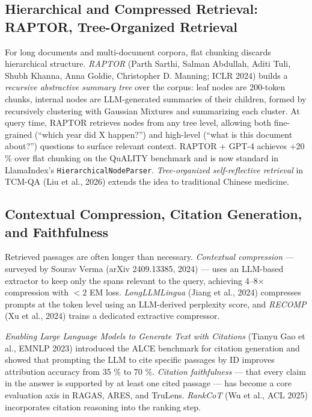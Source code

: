 \subsection{Hierarchical and Compressed Retrieval: RAPTOR, Tree-Organized Retrieval}\label{hierarchical-and-compressed-retrieval-raptor-tree-organized-retrieval}

For long documents and multi-document corpora, flat chunking discards hierarchical structure. \emph{RAPTOR} (Parth Sarthi, Salman Abdullah, Aditi Tuli, Shubh Khanna, Anna Goldie, Christopher D. Manning; ICLR 2024) builds a \emph{recursive abstractive summary tree} over the corpus: leaf nodes are 200-token chunks, internal nodes are LLM-generated summaries of their children, formed by recursively clustering with Gaussian Mixtures and summarizing each cluster. At query time, RAPTOR retrieves nodes from any tree level, allowing both fine-grained (``which year did X happen?'') and high-level (``what is this document about?'') questions to surface relevant context. RAPTOR + GPT-4 achieves +20 \% over flat chunking on the QuALITY benchmark and is now standard in LlamaIndex's \texttt{HierarchicalNodeParser}. \emph{Tree-organized self-reflective retrieval} in TCM-QA (Liu et al., 2026) extends the idea to traditional Chinese medicine.

\subsection{Contextual Compression, Citation Generation, and Faithfulness}\label{contextual-compression-citation-generation-and-faithfulness}

Retrieved passages are often longer than necessary. \emph{Contextual compression} --- surveyed by Sourav Verma (arXiv 2409.13385, 2024) --- uses an LLM-based extractor to keep only the spans relevant to the query, achieving 4--8× compression with \(<2\) EM loss. \emph{LongLLMLingua} (Jiang et al., 2024) compresses prompts at the token level using an LLM-derived perplexity score, and \emph{RECOMP} (Xu et al., 2024) trains a dedicated extractive compressor.

\emph{Enabling Large Language Models to Generate Text with Citations} (Tianyu Gao et al., EMNLP 2023) introduced the ALCE benchmark for citation generation and showed that prompting the LLM to cite specific passages by ID improves attribution accuracy from 35 \% to 70 \%. \emph{Citation faithfulness} --- that every claim in the answer is supported by at least one cited passage --- has become a core evaluation axis in RAGAS, ARES, and TruLens. \emph{RankCoT} (Wu et al., ACL 2025) incorporates citation reasoning into the ranking step.

